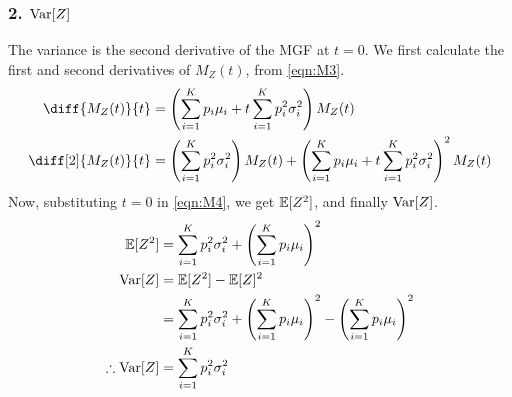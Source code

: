 \subsubsection*{2. $\operatorname{Var}[Z]$}
The variance is the second derivative of the MGF at $t=0$.
We first calculate the first and second derivatives of $M_Z(t)$, from \cref{eqn:M3}.
\begin{align}
	\diff{M_Z(t)}{t}    & = \left(\sum_{i=1}^K p_i \mu_i + t \sum_{i=1}^K p_i^2 \sigma_i^2 \nonumber\right) M_Z(t)                                                         \\
	\diff[2]{M_Z(t)}{t} & = \left(\sum_{i=1}^K p_i^2 \sigma_i^2\right) M_Z(t) + \left(\sum_{i=1}^K p_i \mu_i + t\sum_{i=1}^Kp_i^2\sigma_i^2\right)^2 M_Z(t) \label{eqn:M4}
\end{align}
Now, substituting $t=0$ in \cref{eqn:M4}, we get $\operatorname{\mathbb{E}}[Z^2]$, and finally $\operatorname{Var}[Z]$.
\begin{align}
	\operatorname{\mathbb{E}}[Z^2]           & = \sum_{i=1}^K p_i^2 \sigma_i^2 + \left(\sum_{i=1}^K p_i \mu_i\right)^2 \nonumber                                         \\
	\operatorname{Var}[Z]            & = \operatorname{\mathbb{E}}[Z^2] - \operatorname{\mathbb{E}}[Z]^2 \nonumber                                                                                           \\
	                   & = \sum_{i=1}^K p_i^2 \sigma_i^2 + \left(\sum_{i=1}^K p_i \mu_i\right)^2 - \left(\sum_{i=1}^K p_i \mu_i\right)^2 \nonumber \\
	\therefore \operatorname{Var}[Z] & = \sum_{i=1}^K p_i^2 \sigma_i^2 \label{eqn:V4}
\end{align}

